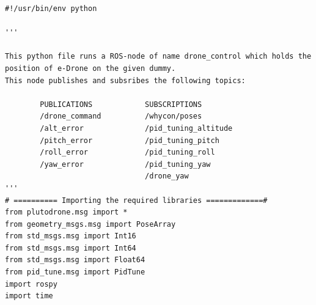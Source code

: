  
% 
\begin{verbatim}
#!/usr/bin/env python

'''

This python file runs a ROS-node of name drone_control which holds the position of e-Drone on the given dummy.
This node publishes and subsribes the following topics:

		PUBLICATIONS			SUBSCRIPTIONS
		/drone_command			/whycon/poses
		/alt_error				/pid_tuning_altitude
		/pitch_error			/pid_tuning_pitch
		/roll_error				/pid_tuning_roll
		/yaw_error				/pid_tuning_yaw
								/drone_yaw
'''
# ========== Importing the required libraries =============#
from plutodrone.msg import *
from geometry_msgs.msg import PoseArray
from std_msgs.msg import Int16
from std_msgs.msg import Int64
from std_msgs.msg import Float64
from pid_tune.msg import PidTune
import rospy
import time


\end{verbatim}
